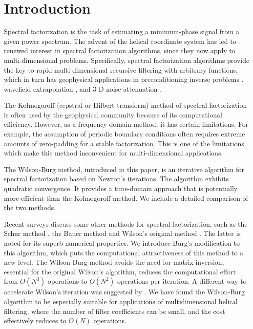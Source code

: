 \section{Introduction}

Spectral factorization is the task of estimating a minimum-phase signal from a
given power spectrum. The advent of the helical coordinate system
\cite[]{helix0,GEO63-05-15321541} has led to renewed interest in spectral factorization
algorithms, since they now apply to multi-dimensional problems. Specifically,
spectral factorization algorithms provide the key to rapid multi-dimensional
recursive filtering with arbitrary functions, which in turn has geophysical
applications in preconditioning inverse problems \cite[]{SEG-1998-1851,GEO68-02-05770588},
wavefield extrapolation
\cite[]{SEG-1998-1124,EAE-2000-P0145,SEG-2000-08620865,SEG-2001-10571060}, and
3-D noise attenuation \cite[]{SEG-1999-12311234,EAE-1999-6039,EAE-2001-P167}.

The Kolmogoroff (cepstral or Hilbert transform) method of spectral
factorization \cite[]{kolmog,Claerbout.fgdp.76,oppenheim} is often used by the
geophysical community because of its computational efficiency. However, as a
frequency-domain method, it has certain limitations. For example, the
assumption of periodic boundary conditions often requires extreme amounts of
zero-padding for a stable factorization. This is one of the limitations which
make this method inconvenient for multi-dimensional applications.

The Wilson-Burg method, introduced in this paper, is an iterative algorithm
for spectral factorization based on Newton's iterations. The algorithm
exhibits quadratic convergence. It provides a time-domain approach that is
potentially more efficient than the Kolmogoroff method. We include a detailed
comparison of the two methods.

Recent surveys \cite[]{goodman,kailath} discuss some other methods for spectral
factorization, such as the Schur method \cite[]{schur}, the Bauer method
\cite[]{bauer} and Wilson's original method \cite[]{mywilson}. The latter is noted
for its superb numerical properties. We introduce Burg's modification to this
algorithm, which puts the computational attractiveness of this method to a new
level. The Wilson-Burg method avoids the need for matrix inversion, essential
for the original Wilson's algorithm, reduces the computational effort from
$O(N^3)$ operations to $O(N^2)$ operations per iteration. A different way to
accelerate Wilson's iteration was suggested by \cite{laurie}. We have
found the Wilson-Burg algorithm to be especially suitable for applications of
multidimensional helical filtering, where the number of filter coefficients
can be small, and the cost effectively reduces to $O(N)$ operations.

